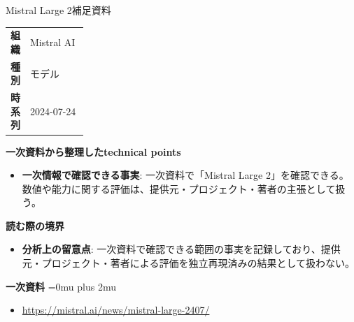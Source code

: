 \begin{technicalnote}{Mistral Large 2}{補足資料}
\begingroup
\begin{tabularx}{\linewidth}{@{}>{\bfseries}p{0.22\linewidth}X@{}}
組織 & Mistral AI \\
種別 & モデル \\
時系列 & 2024-07-24 \\
\end{tabularx}
\smallskip
{\bfseries 一次資料から整理したtechnical points}
\begin{itemize}[leftmargin=1.5em,itemsep=0.35em]
\item \textbf{一次情報で確認できる事実}: 一次資料で「Mistral Large 2」を確認できる。数値や能力に関する評価は、提供元・プロジェクト・著者の主張として扱う。
\end{itemize}
\begin{minipage}{\linewidth}
{\bfseries 読む際の境界}
\begin{itemize}[leftmargin=1.5em,itemsep=0.35em]
\item \textbf{分析上の留意点}: 一次資料で確認できる範囲の事実を記録しており、提供元・プロジェクト・著者による評価を独立再現済みの結果として扱わない。
\end{itemize}
\begin{samepage}
{\bfseries 一次資料}
\begingroup\sloppy
\Urlmuskip=0mu plus 2mu\relax
\begin{itemize}[leftmargin=1.5em,itemsep=0.25em]
\item {\scriptsize\url{https://mistral.ai/news/mistral-large-2407/}}
\end{itemize}
\endgroup
\end{samepage}
\end{minipage}
\endgroup
\end{technicalnote}
\medskip

